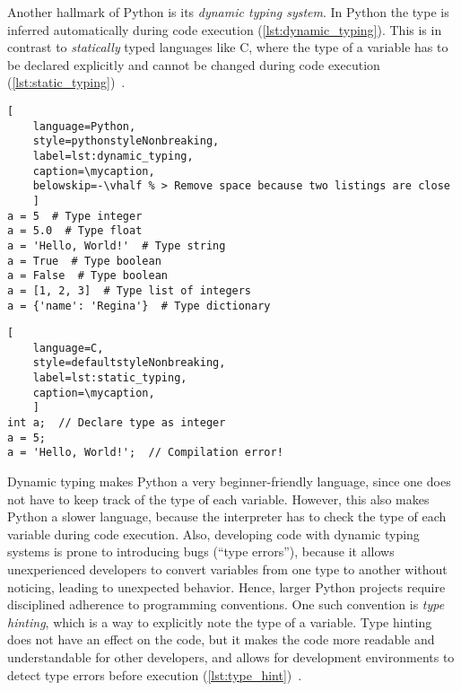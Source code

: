 Another hallmark of Python is its \textit{dynamic typing system}. In Python the
type  is inferred automatically during code execution
(\autoref{lst:dynamic_typing}). This is in contrast to \textit{statically} typed
languages like C, where the type of a variable has to be declared explicitly and
cannot be changed during code execution
(\autoref{lst:static_typing})~\cite{PythonLanguageReference2024}.

\def\mycaption{ Example of dynamic typing in Python. The variable ``\texttt{a}''
    is assigned the value 5, which is of type integer. The variable ``\texttt{a}''
    is then assigned the value ``\texttt{Hello, World!}'', which is of type string.
    Python allows dynamic re-assignment of variables with different types. Note that
    code after ``\texttt{\#}'' is considered a comment and won't be executed.}
\begin{lstlisting}[
    language=Python,
    style=pythonstyleNonbreaking,
    label=lst:dynamic_typing,
    caption=\mycaption,
    belowskip=-\vhalf % > Remove space because two listings are close
    ]
a = 5  # Type integer
a = 5.0  # Type float
a = 'Hello, World!'  # Type string
a = True  # Type boolean
a = False  # Type boolean
a = [1, 2, 3]  # Type list of integers
a = {'name': 'Regina'}  # Type dictionary
\end{lstlisting}

\def\mycaption{ Example of static typing in C. The variable ``\texttt{a}'' is
    declared as an integer (\texttt{int}), and can only store integers. The
    variable ``\texttt{a}'' is then assigned the value 5, which is an integer.
    The variable ``\texttt{a}'' is then assigned the value \texttt{'Hello,
        World!'}, which is a string. This results in a compilation error, because
    the variable ``\texttt{a}'' can only store integers. Note that code after
    ``\texttt{//}'' is considered a comment and won't be executed. }
\begin{lstlisting}[
    language=C,
    style=defaultstyleNonbreaking,
    label=lst:static_typing,
    caption=\mycaption,
    ]
int a;  // Declare type as integer
a = 5;
a = 'Hello, World!';  // Compilation error!
\end{lstlisting}

Dynamic typing makes Python a very beginner-friendly language, since one does
not have to keep track of the type of each variable. However, this also makes
Python a slower language, because the interpreter has to check the type of each
variable during code execution. Also, developing code with dynamic typing
systems is prone to introducing bugs (``type errors''), because it allows
unexperienced developers to convert variables from one type to another without
noticing, leading to unexpected behavior. Hence, larger Python projects require
disciplined adherence to programming conventions. One such convention is
\textit{type hinting}, which is a way to explicitly note the type of a
variable. Type hinting does not have an effect on the code, but it makes the
code more readable and understandable for other developers, and allows for
development environments to detect type errors before execution
(\autoref{lst:type_hint})~\cite{vanrossumPEP484Type2014}.

